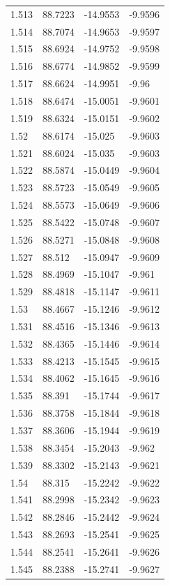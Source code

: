 \begin{tabular}{llll}
1.513 & 88.7223 & -14.9553 & -9.9596 \\
1.514 & 88.7074 & -14.9653 & -9.9597 \\
1.515 & 88.6924 & -14.9752 & -9.9598 \\
1.516 & 88.6774 & -14.9852 & -9.9599 \\
1.517 & 88.6624 & -14.9951 & -9.96 \\
1.518 & 88.6474 & -15.0051 & -9.9601 \\
1.519 & 88.6324 & -15.0151 & -9.9602 \\
1.52 & 88.6174 & -15.025 & -9.9603 \\
1.521 & 88.6024 & -15.035 & -9.9603 \\
1.522 & 88.5874 & -15.0449 & -9.9604 \\
1.523 & 88.5723 & -15.0549 & -9.9605 \\
1.524 & 88.5573 & -15.0649 & -9.9606 \\
1.525 & 88.5422 & -15.0748 & -9.9607 \\
1.526 & 88.5271 & -15.0848 & -9.9608 \\
1.527 & 88.512 & -15.0947 & -9.9609 \\
1.528 & 88.4969 & -15.1047 & -9.961 \\
1.529 & 88.4818 & -15.1147 & -9.9611 \\
1.53 & 88.4667 & -15.1246 & -9.9612 \\
1.531 & 88.4516 & -15.1346 & -9.9613 \\
1.532 & 88.4365 & -15.1446 & -9.9614 \\
1.533 & 88.4213 & -15.1545 & -9.9615 \\
1.534 & 88.4062 & -15.1645 & -9.9616 \\
1.535 & 88.391 & -15.1744 & -9.9617 \\
1.536 & 88.3758 & -15.1844 & -9.9618 \\
1.537 & 88.3606 & -15.1944 & -9.9619 \\
1.538 & 88.3454 & -15.2043 & -9.962 \\
1.539 & 88.3302 & -15.2143 & -9.9621 \\
1.54 & 88.315 & -15.2242 & -9.9622 \\
1.541 & 88.2998 & -15.2342 & -9.9623 \\
1.542 & 88.2846 & -15.2442 & -9.9624 \\
1.543 & 88.2693 & -15.2541 & -9.9625 \\
1.544 & 88.2541 & -15.2641 & -9.9626 \\
1.545 & 88.2388 & -15.2741 & -9.9627 \\

\end{tabular}

